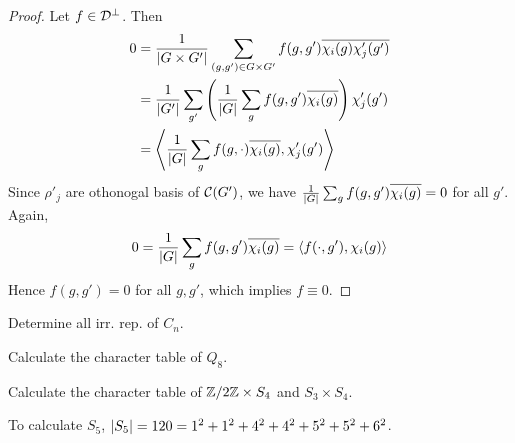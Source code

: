 \begin{theorem}
\begin{proof}
  Let $f \in \mathcal{D}^\perp$. Then
  \begin{align*}
    0 &= \frac{1}{\lvert G\times G'\rvert} \sum_{(g,g')\in G\times G'}
    f(g,g')\overline{\chi_i(g)\chi_j'(g')} \\
    &= \frac{1}{\lvert G'\rvert} \sum_{g'} \left( \frac{1}{\lvert G\rvert}\sum_g f(g, g') \overline{\chi_i(g)} \right) \chi'_j(g') \\
    &= \left\langle \frac{1}{\lvert G\rvert} \sum_g f(g, \cdot) \overline{\chi_i(g)}, \chi'_j(g') \right\rangle
  \end{align*}
  Since $\rho'_j$ are othonogal basis of $\mathcal{C}(G')$, we have $\frac{1}{\lvert G\rvert} \sum_g f(g, g') \overline{\chi_i(g)}
  = 0$ for all $g'$.
  Again,
  \[ 0 = \frac{1}{\lvert G\rvert} \sum_g f(g, g') \overline{\chi_i(g)} = \langle f(\cdot, g'), \chi_i(g)\rangle \]
  Hence $f(g, g') = 0$ for all $g, g'$, which implies $f \equiv 0$.
\end{proof}

\end{theorem}

\begin{exercise}
  Determine all irr. rep. of $C_n$.
\end{exercise}

\begin{exercise}
  Calculate the character table of $Q_8$.
\end{exercise}

\begin{exercise}
  Calculate the character table of ${\mathbb{Z}}/{2\mathbb{Z}}\times S_4$ and
  $S_3\times S_4$.
\end{exercise}

To calculate $S_5$, $\lvert S_5\rvert = 120 = 1^2 + 1^2 + 4^2 + 4^2 + 5^2 + 5^2 + 6^2$.
